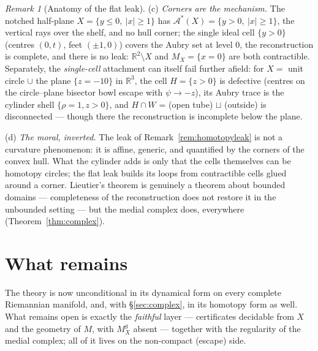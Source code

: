 \documentclass[11pt]{article}
\theoremstyle{remark}
\newtheorem{remark}[theorem]{Remark}
\newcommand{\R}{\mathbb{R}}
\newcommand{\X}{X}
\newcommand{\Mx}{M_{\X}}
\newcommand{\Mg}{M^{g}_{\X}}
\newcommand{\Aub}{\mathcal{A}^{\ast}}
\begin{document}
\begin{remark}[Anatomy of the flat leak]
(c) \emph{Corners are the mechanism.} The notched half-plane
$\X=\{y\le0,\ |x|\ge1\}$ has $\Aub(\X)=\{y>0,\ |x|\ge1\}$, the
vertical rays over the shelf, and no hull corner; the single ideal
cell $\{y>0\}$ (centres $(0,t)$, feet $(\pm1,0)$) covers the Aubry
set at level $0$, the reconstruction is complete, and there is no
leak: $\R^{2}\setminus\X$ and $\Mx=\{x=0\}$ are both contractible.
Separately, the \emph{single-cell} attachment can itself fail
further afield: for $\X=$ unit circle $\cup$ the plane $\{z=-10\}$
in $\R^{3}$, the cell $H=\{z>0\}$ is defective (centres on the
circle--plane bisector bowl escape with
$\psi\to-z$), its Aubry trace is the cylinder shell
$\{\rho=1,z>0\}$, and $H\cap W$ = (open tube) $\sqcup$ (outside) is
disconnected --- though there the reconstruction is incomplete
below the plane.

(d) \emph{The moral, inverted.} The leak of
Remark~\ref{rem:homotopyleak} is not a curvature phenomenon: it is
affine, generic, and quantified by the corners of the convex hull.
What the cylinder adds is only that the cells themselves can be
homotopy circles; the flat leak builds its loops from contractible
cells glued around a corner. Lieutier's theorem is genuinely a
theorem about bounded domains --- completeness of the
reconstruction does not restore it in the unbounded setting --- but
the medial complex does, everywhere (Theorem~\ref{thm:complex}).
\end{remark}

\section{What remains}\label{sec:open}

The theory is now unconditional in its dynamical form on every
complete Riemannian manifold, and, with \S\ref{sec:complex}, in its
homotopy form as well. What remains open is exactly the
\emph{faithful} layer --- certificates decidable from $\X$ and the
geometry of $M$, with $\Mg$ absent --- together with the regularity
of the medial complex; all of it lives on the non-compact (escape)
side.
\end{document}
